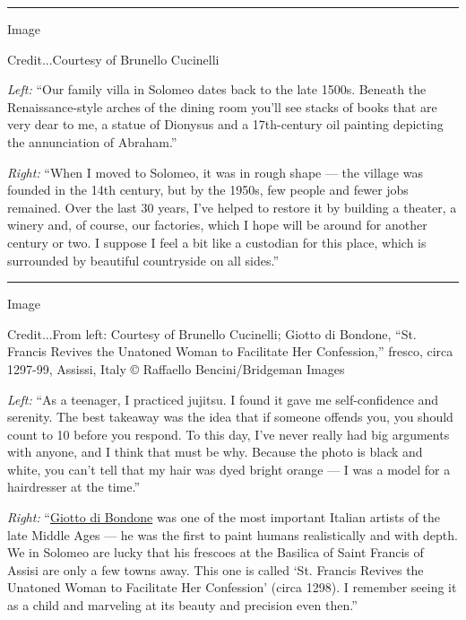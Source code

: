 \begin{center}\rule{0.5\linewidth}{\linethickness}\end{center}

Image

Credit...Courtesy of Brunello Cucinelli

\emph{Left:} ``Our family villa in Solomeo dates back to the late 1500s.
Beneath the Renaissance-style arches of the dining room you'll see
stacks of books that are very dear to me, a statue of Dionysus and a
17th-century oil painting depicting the annunciation of Abraham.''

\emph{Right:} ``When I moved to Solomeo, it was in rough shape --- the
village was founded in the 14th century, but by the 1950s, few people
and fewer jobs remained. Over the last 30 years, I've helped to restore
it by building a theater, a winery and, of course, our factories, which
I hope will be around for another century or two. I suppose I feel a bit
like a custodian for this place, which is surrounded by beautiful
countryside on all sides.''

\begin{center}\rule{0.5\linewidth}{\linethickness}\end{center}

Image

Credit...From left: Courtesy of Brunello Cucinelli; Giotto di Bondone,
``St. Francis Revives the Unatoned Woman to Facilitate Her Confession,''
fresco, circa 1297-99, Assissi, Italy © Raffaello Bencini/Bridgeman
Images

\emph{Left:} ``As a teenager, I practiced jujitsu. I found it gave me
self-confidence and serenity. The best takeaway was the idea that if
someone offends you, you should count to 10 before you respond. To this
day, I've never really had big arguments with anyone, and I think that
must be why. Because the photo is black and white, you can't tell that
my hair was dyed bright orange --- I was a model for a hairdresser at
the time.''

\emph{Right:}
``\href{https://www.nytimes.com/1937/01/17/archives/giotto-600-years-after-sexcentenary-of-death-of-the-painter-to-be.html}{Giotto
di Bondone} was one of the most important Italian artists of the late
Middle Ages --- he was the first to paint humans realistically and with
depth. We in Solomeo are lucky that his frescoes at the Basilica of
Saint Francis of Assisi are only a few towns away. This one is called
`St. Francis Revives the Unatoned Woman to Facilitate Her Confession'
(circa 1298). I remember seeing it as a child and marveling at its
beauty and precision even then.''

